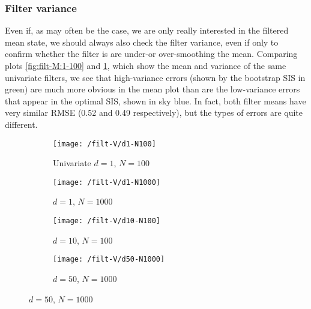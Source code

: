 \documentclass[10pt,fleqn]{article}
\begin{document}
\subsubsection{Filter variance}

Even if, as may often be the case, we are only really interested in the filtered mean state, we should always also check the filter variance, even if only to confirm whether the filter is are under-or over-smoothing the mean. Comparing plots \ref{fig:filt-M:1-100} and \ref{fig:filt-V:1-100}, which show the mean and variance of the same univariate filters, we see that high-variance errors (shown by the bootstrap SIS in green) are much more obvious in the mean plot than are the low-variance errors that appear in the optimal SIS, shown in sky blue. In fact, both filter means have very similar RMSE (0.52 and 0.49 respectively), but the types of errors are quite different. 

\begin{figure}[H]		%
\caption{Examples of marginal filter variance performance with varying dimension}
\label{filt-V}

	\begin{subfigure}[t]{0.5\textwidth}
		\caption{Univariate $d = 1$, $N = 100$}
		\label{fig:filt-V:1-100}
		\texttt{[image: /filt-V/d1-N100]}
	\end{subfigure}
	\begin{subfigure}[t]{0.5\textwidth}
		\caption{$d = 1$, $N = 1000$}
		\texttt{[image: /filt-V/d1-N1000]}
	\end{subfigure}
	\vspace{10pt}
	
	\begin{subfigure}[t]{0.5\textwidth}
		\caption{$d = 10$, $N = 100$}
		\texttt{[image: /filt-V/d10-N100]}
	\end{subfigure}
	\begin{subfigure}[t]{0.5\textwidth}
				\caption{$d = 50$, $N = 1000$}
		\texttt{[image: /filt-V/d50-N1000]}
	\end{subfigure}

\end{figure}
\end{document}
